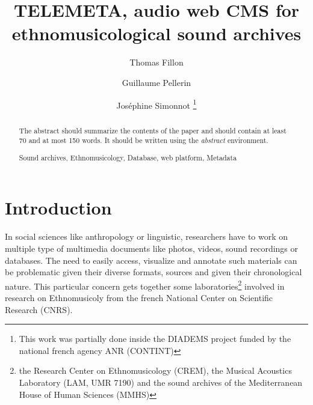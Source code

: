 \documentclass[runningheads,a4paper]{llncs}
\newcommand{\keywords}[1]{\par\addvspace\baselineskip
\noindent\keywordname\enspace\ignorespaces#1}
\begin{document}
\mainmatter  %

\title{TELEMETA, audio web CMS for ethnomusicological sound archives}


%
%
\author{Thomas Fillon \and Guillaume Pellerin
 \and Jos{\'e}phine Simonnot 
\thanks{This work was partially done inside the DIADEMS project funded by the national french agency ANR (CONTINT)}
}
%


\maketitle

\setcounter{footnote}{0}


\begin{abstract}
The abstract should summarize the contents of the paper and should
contain at least 70 and at most 150 words. It should be written using the
\emph{abstract} environment.
\keywords{Sound archives, Ethnomusicology, Database, web platform, Metadata}
\end{abstract}


\section{Introduction}

In social sciences like anthropology or linguistic, researchers have to work on multiple type of multimedia documents like photos, videos, sound recordings or databases. The need to easily access, visualize and annotate such materials can be problematic given their diverse formats, sources and given their chronological nature.
This particular concern gets together some laboratories\footnote{the Research Center on Ethnomusicology (CREM), the Musical Acoustics Laboratory (LAM, UMR 7190) and the sound archives of the Mediterranean House of Human Sciences (MMHS)} involved in research on Ethnomusicoly from  the french National Center on Scientific Research (CNRS).
\end{document}
